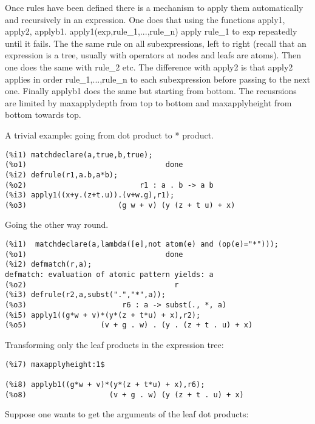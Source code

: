 \documentclass[a4paper,11pt]{article}
\begin{document}
Once rules have been defined there is a mechanism to apply them
automatically and recursively in an expression. One does that using the
functions apply1, apply2, applyb1.  apply1(exp,rule\_1,...,rule\_n)
apply rule\_1 to exp repeatedly until it fails. The the same rule on
all subexpressions, left to right (recall that an expression is a
tree, usually with operators at nodes and leafs are atoms). Then one
does the same with rule\_2 etc.  The difference with apply2 is that
apply2 applies in order rule\_1,...,rule\_n to each subexpression before
passing to the next one.  Finally applyb1 does the same but starting
from bottom. The recusrsions are limited by maxapplydepth from top to
bottom and maxapplyheight from bottom towards top.

A trivial example: going from dot product to * product.
\begin{verbatim}
(%i1) matchdeclare(a,true,b,true);
(%o1)                                done
(%i2) defrule(r1,a.b,a*b);
(%o2)                          r1 : a . b -> a b
(%i3) apply1((x+y.(z+t.u)).(v+w.g),r1);
(%o3)                     (g w + v) (y (z + t u) + x)
\end{verbatim}
Going the other way round.
\begin{verbatim}
(%i1)  matchdeclare(a,lambda([e],not atom(e) and (op(e)="*")));
(%o1)                                done
(%i2) defmatch(r,a);
defmatch: evaluation of atomic pattern yields: a
(%o2)                                  r
(%i3) defrule(r2,a,subst(".","*",a));
(%o3)                      r6 : a -> subst(., *, a)
(%i5) apply1((g*w + v)*(y*(z + t*u) + x),r2);
(%o5)                 (v + g . w) . (y . (z + t . u) + x)
\end{verbatim}
Transforming only the leaf products in the expression tree:

\begin{verbatim}
(%i7) maxapplyheight:1$

(%i8) applyb1((g*w + v)*(y*(z + t*u) + x),r6);
(%o8)                   (v + g . w) (y (z + t . u) + x)
\end{verbatim}
Suppose one wants to get the arguments of the leaf dot products:
\end{document}
